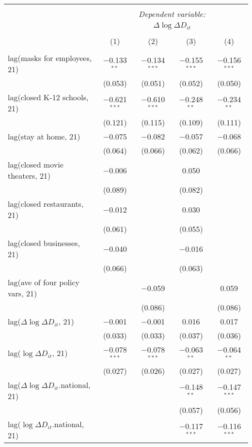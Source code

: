 \begin{tabular}{@{\extracolsep{1pt}}lcccc} 
\\[-1.8ex]\hline 
\hline \\[-1.8ex] 
 & \multicolumn{4}{c}{\textit{Dependent variable:}} \\ 
\cline{2-5} 
 & \multicolumn{4}{c}{$\Delta \log \Delta D_{it}$} \\ 
\\[-1.8ex] & (1) & (2) & (3) & (4)\\ 
\hline \\[-1.8ex] 
 lag(masks for employees, 21) & $-$0.133$^{**}$ & $-$0.134$^{***}$ & $-$0.155$^{***}$ & $-$0.156$^{***}$ \\ 
  & (0.053) & (0.051) & (0.052) & (0.050) \\ 
  lag(closed K-12 schools, 21) & $-$0.621$^{***}$ & $-$0.610$^{***}$ & $-$0.248$^{**}$ & $-$0.234$^{**}$ \\ 
  & (0.121) & (0.115) & (0.109) & (0.111) \\ 
  lag(stay at home, 21) & $-$0.075 & $-$0.082 & $-$0.057 & $-$0.068 \\ 
  & (0.064) & (0.066) & (0.062) & (0.066) \\ 
  lag(closed movie theaters, 21) & $-$0.006 &  & 0.050 &  \\ 
  & (0.089) &  & (0.082) &  \\ 
  lag(closed restaurants, 21) & $-$0.012 &  & 0.030 &  \\ 
  & (0.061) &  & (0.055) &  \\ 
  lag(closed businesses, 21) & $-$0.040 &  & $-$0.016 &  \\ 
  & (0.066) &  & (0.063) &  \\ 
  lag(ave of four policy vars, 21) &  & $-$0.059 &  & 0.059 \\ 
  &  & (0.086) &  & (0.086) \\ 
  lag($\Delta \log \Delta D_{it}$, 21) & $-$0.001 & $-$0.001 & 0.016 & 0.017 \\ 
  & (0.033) & (0.033) & (0.037) & (0.036) \\ 
  lag($\log \Delta D_{it}$, 21) & $-$0.078$^{***}$ & $-$0.078$^{***}$ & $-$0.063$^{**}$ & $-$0.064$^{**}$ \\ 
  & (0.027) & (0.026) & (0.027) & (0.027) \\ 
  lag($\Delta \log \Delta D_{it}$.national, 21) &  &  & $-$0.148$^{**}$ & $-$0.147$^{***}$ \\ 
  &  &  & (0.057) & (0.056) \\ 
  lag($\log \Delta D_{it}$.national, 21) &  &  & $-$0.117$^{***}$ & $-$0.116$^{***}$ \\ 

\end{tabular}
